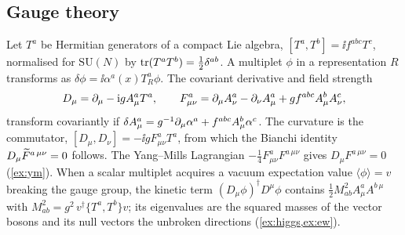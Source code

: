 \subsection{Gauge theory}
\label{sec:fw-gauge}

Let $T^a$ be Hermitian generators of a compact Lie algebra, $[T^a,T^b]=\ii f^{abc}T^c$, normalised for $\mathrm{SU}(N)$ by $\operatorname{tr}(T^aT^b)=\tfrac12\delta^{ab}$. A multiplet $\phi$ in a representation $R$ transforms as $\delta\phi=\ii\alpha^a(x)T^a_R\phi$. The covariant derivative and field strength
\begin{equation}
D_\mu=\partial_\mu-\mathrm{i} gA_\mu^aT^a,\qquad F_{\mu\nu}^a=\partial_\mu A_\nu^a-\partial_\nu A_\mu^a+gf^{abc}A_\mu^bA_\nu^c,
\label{eq:DF}
\end{equation}
transform covariantly if $\delta A_\mu^a=g^{-1}\partial_\mu\alpha^a+f^{abc}A_\mu^b\alpha^c$. The curvature is the commutator, $[D_\mu,D_\nu]=-\ii gF_{\mu\nu}^aT^a$, from which the Bianchi identity $D_\mu\widetilde{F}^{a\,\mu\nu}=0$ follows. The Yang--Mills Lagrangian $-\tfrac14F^a_{\mu\nu}F^{a\,\mu\nu}$ gives $D_\mu F^{a\,\mu\nu}=0$ (\cref{ex:ym}). When a scalar multiplet acquires a vacuum expectation value $\langle\phi\rangle=v$ breaking the gauge group, the kinetic term $(D_\mu\phi)^\dagger D^\mu\phi$ contains $\tfrac12M^2_{ab}A^a_\mu A^{b\,\mu}$ with $M^2_{ab}=g^2\,v^\dagger\{T^a,T^b\}v$; its eigenvalues are the squared masses of the vector bosons and its null vectors the unbroken directions (\cref{ex:higgs,ex:ew}).
